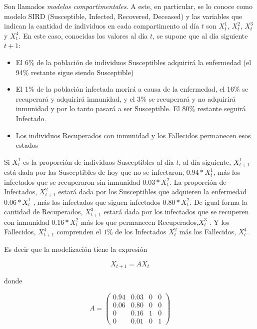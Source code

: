 \bigskip


Son llamados \textit{modelos compartimentales}. A este, en particular, se lo conoce como modelo SIRD (Susceptible, Infected, Recovered, Deceased) y las variables que indican  la cantidad de individuos en cada compartimento al día $t$ son $X_t^1$, $X_t^2$, $X_t^3$  y $X_t^4$. En este caso, conocidas los valores al día $t$, se supone que al día siguiente $t+1$:

\begin{itemize}
\item

El 6\% de la población de individuos Susceptibles adquirirá la enfermedad (el 94\% restante sigue siendo Susceptible)
\item

El 1\% de la población infectada morirá a causa de la enfermedad, el 16\% se recuperará y adquirirá inmunidad, y el 3\% se recuperará y no adquirirá inmunidad y por lo tanto pasará a ser Susceptible. El 80\% restante seguirá Infectado.
\item

Los individuos  Recuperados con inmunidad  y los Fallecidos permanecen esos estados



\end{itemize}


\bigskip


Si $X_t^1$ es  la proporción de individuos Susceptibles al día $t$,  al día siguiente, $X_{t+1}^1$  está dada por las Susceptibles de hoy que no se infectaron, $0.94*X_t^1$, más los infectados que se recuperaron sin inmunidad $0.03 *X_t^2   $.
La proporción de Infectados, $X_{t+1}^2$ estará dada por los Susceptibles que adquieren la enfermedad  $0.06 *X_t^1   $ , más los infectados que siguen infectados $0.80 *X_t^2$. De igual forma la cantidad de Recuperados, $X_{t+1}^3$  estará dada por los infectados que se recuperen con inmunidad  $0.16 *X_t^2$    más los que permanecen Recuperados,$ X_{t}^3$ . Y los Fallecidos, $X_{t+1}^4$ comprenden el $1\%$ de los Infectados $X_{t}^2$  más los Fallecidos, $X_{t}^4$.


\bigskip


Es decir que la modelización tiene la expresión


$$X_{t+1}= AX_{t}    $$

\noindent
donde 

$$A=\left(\begin{array}{cccc}  0.94  & 0.03  & 0 & 0  \\ 0.06 &  0.80 & 0 &  0 \\ 0 & 0.16 & 1 & 0 \\0 & 0.01 &  0  & 1
\end{array}
 \right)$$

